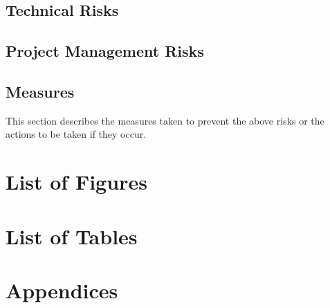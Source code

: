 \documentclass{article}
\begin{document}
\subsection{Technical Risks}
\subsection{Project Management Risks}
\subsection{Measures}
This section describes the measures taken to prevent the above risks or the actions to be taken if they occur.


\newpage

\section{List of Figures}

\section{List of Tables}

\section{Appendices}
\end{document}
